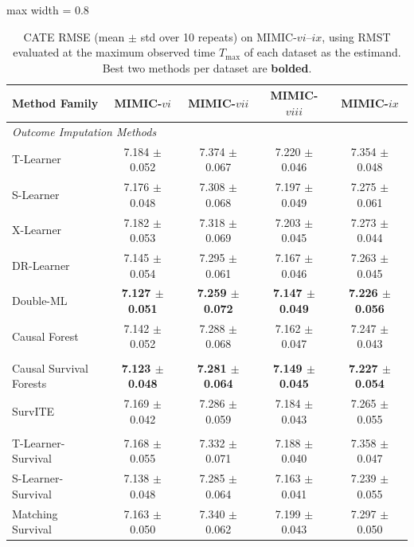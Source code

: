 \documentclass{article} %
\begin{document}
\begin{table}[!ht]
    \centering
    \caption{CATE RMSE (mean $\pm$ std over 10 repeats) on MIMIC-$vi$--$ix$, using RMST evaluated at the maximum observed time $T_{\max}$ of each dataset as the estimand. Best two methods per dataset are \textbf{bolded}.}
    \label{tab:mimic-vi-ix-results}
    \begin{adjustbox}{max width = 0.8\textwidth}
    \begin{tabular}{lcccc}
    \toprule
        \textbf{Method Family} & \textbf{MIMIC-$vi$} & \textbf{MIMIC-$vii$} & \textbf{MIMIC-$viii$} & \textbf{MIMIC-$ix$} \\ 
    \midrule
    \multicolumn{5}{l}{\textit{Outcome Imputation Methods}} \\
        T-Learner & 7.184 $\pm$ 0.052 & 7.374 $\pm$ 0.067 & 7.220 $\pm$ 0.046 & 7.354 $\pm$ 0.048 \\ 
        S-Learner & 7.176 $\pm$ 0.048 & 7.308 $\pm$ 0.068 & 7.197 $\pm$ 0.049 & 7.275 $\pm$ 0.061 \\ 
        X-Learner & 7.182 $\pm$ 0.053 & 7.318 $\pm$ 0.069 & 7.203 $\pm$ 0.045 & 7.273 $\pm$ 0.044 \\ 
        DR-Learner & 7.145 $\pm$ 0.054 & 7.295 $\pm$ 0.061 & 7.167 $\pm$ 0.046 & 7.263 $\pm$ 0.045 \\ 
        Double-ML & \textbf{7.127 $\pm$ 0.051} & \textbf{7.259 $\pm$ 0.072} & \textbf{7.147 $\pm$ 0.049} & \textbf{7.226 $\pm$ 0.056} \\ 
        Causal Forest & 7.142 $\pm$ 0.052 & 7.288 $\pm$ 0.068 & 7.162 $\pm$ 0.047 & 7.247 $\pm$ 0.043 \\ 
    \addlinespace
    \multicolumn{5}{l}{\textit{Direct-Survival CATE Methods}} \\
        Causal Survival Forests & \textbf{7.123 $\pm$ 0.048} & \textbf{7.281 $\pm$ 0.064} & \textbf{7.149 $\pm$ 0.045} & \textbf{7.227 $\pm$ 0.054} \\ 
        SurvITE & 7.169 $\pm$ 0.042 & 7.286 $\pm$ 0.059 & 7.184 $\pm$ 0.043 & 7.265 $\pm$ 0.055 \\ 
    \addlinespace
    \multicolumn{5}{l}{\textit{Survival Meta-Learners}} \\
        T-Learner-Survival & 7.168 $\pm$ 0.055 & 7.332 $\pm$ 0.071 & 7.188 $\pm$ 0.040 & 7.358 $\pm$ 0.047 \\ 
        S-Learner-Survival & 7.138 $\pm$ 0.048 & 7.285 $\pm$ 0.064 & 7.163 $\pm$ 0.041 & 7.239 $\pm$ 0.055 \\ 
        Matching Survival & 7.163 $\pm$ 0.050 & 7.340 $\pm$ 0.062 & 7.199 $\pm$ 0.043 & 7.297 $\pm$ 0.050 \\ 
    \bottomrule
    \end{tabular}
    \end{adjustbox}
\end{table}
\end{document}
